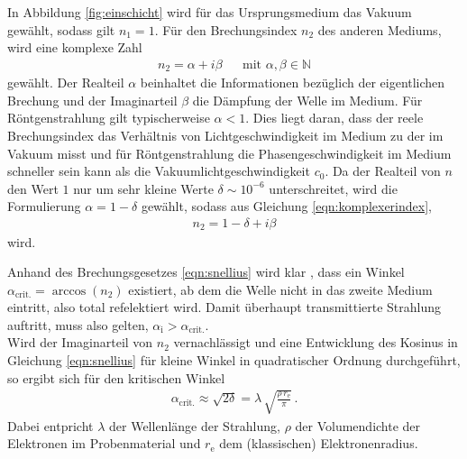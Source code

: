 In Abbildung \ref{fig:einschicht} wird für das Ursprungsmedium das Vakuum gewählt,
sodass gilt $n_{1} = 1$. Für den Brechungsindex $n_{2}$ des anderen Mediums,
wird eine komplexe Zahl
\begin{align}
  n_{2} = \alpha + i \beta& &\text{mit } \alpha, \beta \in \mathbb{N}
  \label{eqn:komplexerindex}
\end{align}
gewählt. Der Realteil $\alpha$ beinhaltet die Informationen bezüglich der
eigentlichen Brechung und der Imaginarteil $\beta$
die Dämpfung der Welle im Medium. Für Röntgenstrahlung gilt typischerweise
$\alpha < 1$. Dies liegt daran, dass der reele Brechungsindex das Verhältnis
von Lichtgeschwindigkeit im Medium zu der im Vakuum misst und für
Röntgenstrahlung die Phasengeschwindigkeit im Medium schneller
sein kann als die Vakuumlichtgeschwindigkeit $c_{0}$.
Da der Realteil von $n$ den Wert $1$ nur um sehr kleine Werte
$\delta \sim 10^{-6}$ unterschreitet, wird die Formulierung
$\alpha = 1 - \delta$ gewählt,
sodass aus Gleichung \eqref{eqn:komplexerindex},
\begin{align}
  n_{2} = 1 - \delta + i \beta
  \label{eqn:komplexerindexdelta}
\end{align}
wird.

Anhand des Brechungsgesetzes \eqref{eqn:snellius} wird klar , dass ein Winkel
$\alpha_\text{{crit.}} = \arccos\left( n_{2} \right)$ existiert,
ab dem die Welle nicht in das zweite Medium eintritt,
also total refelektiert wird.
Damit überhaupt transmittierte Strahlung auftritt, muss also gelten,
$\alpha_{\text{i}} > \alpha_{\text{crit.}}$.\\
Wird der Imaginarteil von $n_{2}$ vernachlässigt und eine Entwicklung
des Kosinus in Gleichung \eqref{eqn:snellius} für kleine Winkel in
quadratischer Ordnung durchgeführt, so ergibt sich für den kritischen Winkel
\begin{align}
  \alpha_{\text{crit.}} \approx \sqrt{2 \delta} = \lambda \,
  \sqrt{\frac{ \rho \, r_{\text{e}} }{ \pi }} \, .
\end{align}
Dabei entpricht $\lambda$ der Wellenlänge der Strahlung, $\rho$ der
Volumendichte der Elektronen im Probenmaterial und $r_{\text{e}}$ dem
(klassischen) Elektronenradius.

